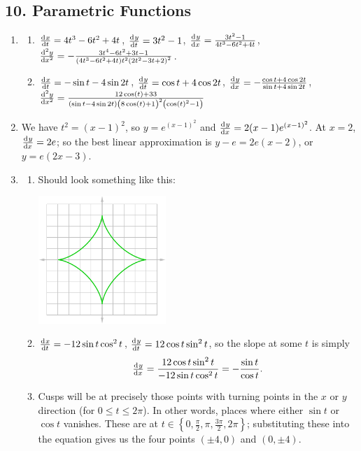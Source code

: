 \subsection*{10. Parametric Functions}
\begin{enumerate}
  \item
    \begin{enumerate}
      \item $ \od{x}{t} = 4t^3 - 6t^2 + 4t $, $ \od{y}{t} = 3t^2 - 1 $, $ \od{y}{x} = \frac{3t^2 - 1}{4t^3 - 6t^2 + 4t} $,
            $ \od[2]{y}{x} = -\frac{3 t^4-6 t^2+3 t-1}{(4t^3 - 6t^2 + 4t)t^2 {\left(2 t^2-3 t+2\right)}^2} $.
      \item $ \od{x}{t} = -\sin t - 4\sin 2t $, $ \od{y}{t} = \cos t + 4\cos 2t $, $ \od{y}{x} = -\frac{\cos t + 4\cos 2t}{\sin t + 4\sin 2t} $,
            $ \od[2]{y}{x} = \frac{12 \cos\left(t\right)+33}{ (\sin t - 4\sin 2t) {\left(8 \cos\left(t\right)+1\right)}^2 \left({\cos\left(t\right)}^2-1\right)} $
    \end{enumerate}
  \item We have $ t^2 = (x - 1)^2 $, so $ y = e^{(x - 1)^2} $ and $ \od{y}{x} = 2(x-1) e^{(x-1)^2} $. At $ x = 2 $, $ \od{y}{x} = 2e $; so the
        best linear approximation is $ y - e = 2e(x - 2) $, or $ y =  e(2x - 3) $.
  \item
    \begin{enumerate}
      \item Should look something like this:

            \begin{center}
              \includegraphics[width=0.4\textwidth]{astroid}
            \end{center}
      \item $ \od{x}{t} = -12\sin t \cos^2 t $, $ \od{y}{t} = 12\cos t \sin^2 t $, so the slope at some $ t $ is simply
            \begin{displaymath}
              \od{y}{x} = \frac{12\cos t \sin^2 t}{-12\sin t \cos^2 t} = -\frac{\sin t}{\cos t}.
            \end{displaymath}
      \item Cusps will be at precisely those points with turning points in the $ x $ or $ y $ direction (for $ 0 \leq t \leq 2\pi $). In
            other words, places where either $ \sin t $ or $ \cos t $ vanishes. These are at $ t \in \left\{0, \frac{\pi}{2}, \pi, \frac{3\pi}{2}, 2\pi\right\} $;
            substituting these into the equation gives us the four points $ (\pm 4, 0) $ and $ (0, \pm 4) $.
    \end{enumerate}
\end{enumerate}

